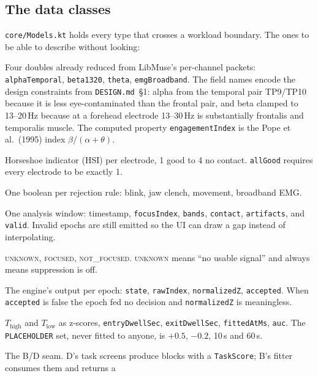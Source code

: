 \documentclass[10pt,a4paper]{article}
\newcommand{\file}[1]{\texttt{\small #1}}          %
\newcommand{\code}[1]{\texttt{#1}}                  %
\newcommand{\state}[1]{\textsc{\small #1}}          %
\newcommand{\Thigh}{T_{\mathrm{high}}}
\newcommand{\Tlow}{T_{\mathrm{low}}}
\begin{document}
\subsection{The data classes}

\file{core/Models.kt} holds every type that crosses a workload boundary. The ones to be able to
describe without looking:

\begin{description}[style=nextline,leftmargin=1.2em]
\item[\code{BandPowers}] Four doubles already reduced from LibMuse's per-channel packets:
  \code{alphaTemporal}, \code{beta1320}, \code{theta}, \code{emgBroadband}. The field names encode
  the design constraints from \file{DESIGN.md}~\S1: alpha from the temporal pair TP9/TP10 because
  it is less eye-contaminated than the frontal pair, and beta clamped to 13--20\,Hz because at a
  forehead electrode 13--30\,Hz is substantially frontalis and temporalis muscle. The computed
  property \code{engagementIndex} is the Pope et al.\ (1995) index
  $\beta/(\alpha+\theta)$.
\item[\code{ContactQuality}] Horseshoe indicator (HSI) per electrode, 1 good to 4 no contact.
  \code{allGood} requires every electrode to be exactly 1.
\item[\code{ArtifactFlags}] One boolean per rejection rule: blink, jaw clench, movement, broadband
  EMG.
\item[\code{FocusEpoch}] One analysis window: timestamp, \code{focusIndex}, \code{bands},
  \code{contact}, \code{artifacts}, and \code{valid}. Invalid epochs are still emitted so the UI
  can draw a gap instead of interpolating.
\item[\code{FocusState}] \state{unknown}, \state{focused}, \state{not\_focused}. \state{unknown}
  means ``no usable signal'' and always means suppression is off.
\item[\code{FocusDecision}] The engine's output per epoch: \code{state}, \code{rawIndex},
  \code{normalizedZ}, \code{accepted}. When \code{accepted} is false the epoch fed no decision and
  \code{normalizedZ} is meaningless.
\item[\code{FocusThresholds}] $\Thigh$ and $\Tlow$ as z-scores, \code{entryDwellSec},
  \code{exitDwellSec}, \code{fittedAtMs}, \code{auc}. The \code{PLACEHOLDER} set, never fitted to
  anyone, is $+0.5$, $-0.2$, 10\,s and 60\,s.
\item[\code{CalibrationBlock}, \code{TaskScore}, \code{CalibrationResult}] The B/D seam. D's
  task screens produce blocks with a \code{TaskScore}; B's fitter consumes them and returns a

\end{description}
\end{document}
